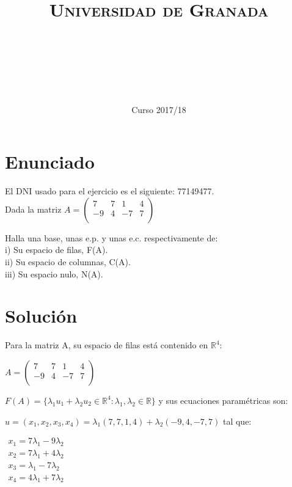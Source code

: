 \documentclass[11pt, a4paper]{article}
\title{
  \normalfont \normalsize 
  \textsc{Universidad de Granada} \\ [25pt]    %
  \horrule{0.5pt} \\[0.4cm] %
  \huge \sffamily\subject\\ %
  \horrule{2pt} \\[0.5cm] %
}
\author{\Large\sffamily{\docauthor}}
\date{\vspace{-1.5em} \normalsize \sffamily Curso 2017/18}
\newif\IfInSansMode
\newcommand{\R}{\mathbb{R}} \newcommand{\N}{\mathbb{N}}
\theoremstyle{theorem-style}
\theoremstyle{definition-style}
\theoremstyle{remark-style}
\theoremstyle{example-style}
\begin{document}
\maketitle  %
\vfill
\begin{center}
\end{center}
\newpage
\tableofcontents    %
\newpage



\section{Enunciado}
El DNI usado para el ejercicio es el siguiente: 77149477. \\

Dada la matriz 
$A = \begin{pmatrix}
7 & 7 & 1 & 4 \\
-9 & 4 & -7 & 7 \\
\end{pmatrix}$ 
	
Halla una base, unas e.p. y unas e.c. respectivamente de: \\
i) Su espacio de filas, F(A). \\
ii) Su espacio de columnas, C(A). \\
iii) Su espacio nulo, N(A). \\

\section{Solución}

Para la matriz A, su espacio de filas está contenido en $\R^4$:

$A = \begin{pmatrix}
7 & 7 & 1 & 4 \\
-9 & 4 & -7 & 7 \\
\end{pmatrix}$ 

$F(A)= \{\lambda_1u_1 + \lambda_2u_2 \in \R^4: \lambda_1, \lambda_2 \in \R \}$ y sus ecuaciones paramétricas son: 

$ u = (x_1,x_2,x_3,x_4) = \lambda_1(7,7,1,4) + \lambda_2(-9,4,-7,7)$ tal que:

 $\begin{array}{c} x_1=7\lambda_1-9\lambda_2 \\ x_2=7\lambda_1+4\lambda_2\\x_3=\lambda_1-7\lambda_2\\x_4=4\lambda_1+7\lambda_2 \end{array} $
 
\end{document}
